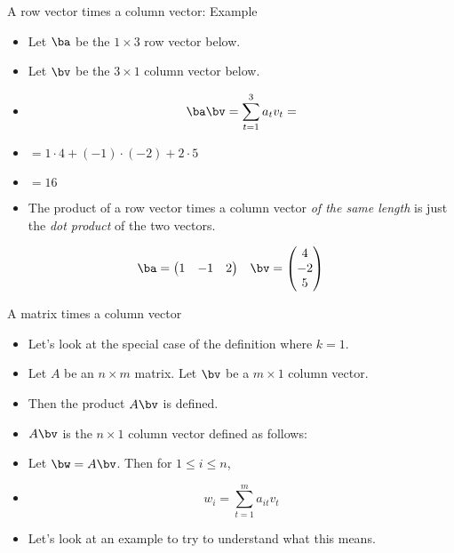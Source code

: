 \documentclass{beamer}
\begin{document}
\begin{frame}{A row vector times a column vector: Example}

\begin{itemize}
\item Let $\ba$ be the $1\times 3$ row vector below.
\item Let $\bv$ be the $3\times 1$ column vector below.
\item $$\ba \bv  = \sum_{t=1}^3 a_t  v_t = $$
\item $ = 1\cdot 4 + (-1)\cdot (-2) + 2\cdot 5$
\item $=16$
\item The product of a row vector times a column vector
\emph{of the same length} is just the \emph{dot product} of the two vectors.
\end{itemize}

$$
\begin{matrix}

\ba =

\begin{pmatrix}
1 & -1 & 2
\end{pmatrix}

&

\bv =

\begin{pmatrix}
4 \\ -2 \\ 5
\end{pmatrix}

\end{matrix}
$$

\end{frame}


\begin{frame}{A matrix times a column vector}

\begin{itemize}
\item Let's look at the special case of the  definition where $k=1$.
\item Let $A$ be an $n\times m$ matrix. Let $\bv$ be a $m\times 1$ column vector.
\item Then the product $A \bv$ is defined.
\item $A \bv$ is the $n\times 1$ column vector defined as follows:
\item Let $\bw=A \bv$. Then for $1\leq i \leq n$,
\item $$w_i = \sum_{t=1}^m a_{it} v_{t}$$
\item Let's look at an example to try to understand what this means.
\end{itemize}

\end{frame}
\end{document}

